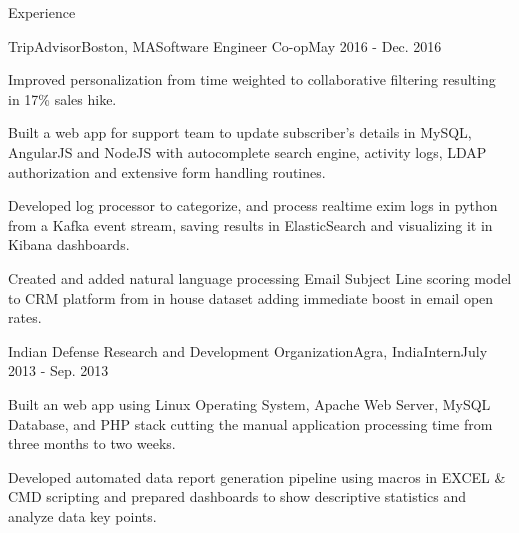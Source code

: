 \documentclass{resume} %
\begin{document}
\begin{rSection}{Experience}

\begin{rSubsection}{TripAdvisor}{Boston, MA}{Software Engineer Co-op}{May 2016 - Dec. 2016}
\item Improved personalization from time weighted to collaborative filtering resulting in 17\% sales hike.
\item Built a web app for support team to update subscriber’s details in MySQL, AngularJS and NodeJS with autocomplete search engine, activity logs, LDAP authorization and extensive form handling routines.
\item Developed log processor to categorize, and process realtime exim logs in python from a  Kafka event stream, saving results in ElasticSearch and visualizing it in Kibana dashboards.
\item Created and added natural language processing Email Subject Line scoring model to CRM platform from in house dataset adding immediate boost in email open rates.
\end{rSubsection}


\begin{rSubsection}{Indian Defense Research and Development Organization}{Agra, India}{Intern}{July 2013 - Sep. 2013}
\item Built an web app using Linux Operating System, Apache Web Server, MySQL Database, and PHP stack cutting the manual application processing time from three months to two weeks.
\item Developed automated data report generation pipeline using macros in EXCEL \& CMD scripting and prepared dashboards to show descriptive statistics and analyze data key points.

\end{rSubsection}

\end{rSection}

\end{document}
